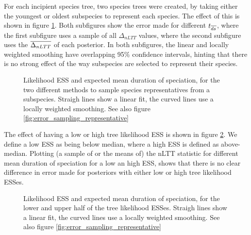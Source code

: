 For each incipient species tree, two species trees were created, by taking
either the youngest or oldest subspecies to represent each species.
The effect of this is shown in figure \ref{fig:error_expected_mean_dur_spec_sampling}.
Both subfigures show the
error made for different $t_{\overline{ds}}$, where the first subfigure uses a sample
of all $\Delta_{nLTT}$ values, where the second subfigure uses the $\overline{\Delta_{nLTT}}$
of each posterior. In both subfigures, the linear and locally weighted smoothing
have overlapping 95\% confidence intervals, hinting that there is no strong effect
of the way subspecies are selected to represent their species.  

\begin{figure}[!htbp]
  \caption{
    Likelihood ESS and expected mean duration of speciation, for the two
    different methods to sample species representatives from a subspecies. 
    Straigh lines show a linear
    fit, the curved lines use a locally weighted smoothing.
    See also figure \ref{fig:error_sampling_representative}
  }
  \label{fig:error_expected_mean_dur_spec_sampling}
\end{figure}


The effect of having a low or high tree likelihood ESS is shown in 
figure \ref{fig:figure_error_expected_mean_dur_spec_low_high_ess}. We
define a low ESS as being below median, where a high ESS is defined as 
above-median. Plotting (a sample of or the means of) the nLTT statistic for different mean
duration of speciation for a low an high ESS, shows that there is no clear
difference in error made for posteriors with either low or high tree likelihood ESSes.

\begin{figure}[!htbp]
  \caption{
    Likelihood ESS and expected mean duration of speciation, for the lower and upper half of the tree likelihood ESSes. 
    Straigh lines show a linear
    fit, the curved lines use a locally weighted smoothing.
    See also figure \ref{fig:error_sampling_representative}
  }
  \label{fig:figure_error_expected_mean_dur_spec_low_high_ess}
\end{figure}

